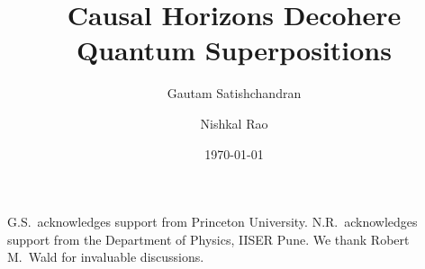 \documentclass[aps,prd,twocolumn,nofootinbib,longbibliography,superscriptaddress]{revtex4-2}
\begin{document}
\title{Causal Horizons Decohere Quantum Superpositions}

\author{Gautam Satishchandran }

\author{Nishkal Rao }

\date{\today}

\begin{abstract}

\end{abstract}

\maketitle










\begin{acknowledgments}
G.S.\ acknowledges support from Princeton University.
N.R.\ acknowledges support from the Department of Physics, IISER Pune.
We thank Robert M.\ Wald for invaluable discussions.
\end{acknowledgments}

\appendix





\end{document}
